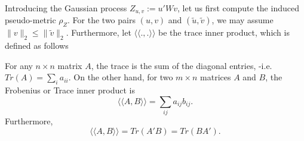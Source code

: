 \documentclass[10pt,handout,english]{beamer}
\begin{document}
\begin{frame}[allowframebreaks]
Introducing the Gaussian process $Z_{u,v}:=u'Wv$, let us first compute the induced pseudo-metric $\rho_Z$. For the two pairs $(u,v)$ and $(\tilde{u},\tilde{v})$, we may assume $\lVert v\rVert_2\leq\lVert\tilde{v}\rVert_2$. Furthermore, let $\langle\langle .,.\rangle\rangle$ be the trace inner product, which is defined as follows
\begin{definition}
For any $n\times n$ matrix $A$, the trace is the sum of the diagonal entries, -i.e. $Tr(A)=\sum\limits_{i}a_{ii}$. On the other hand, for two $m\times n$ matrices $A$ and $B$, the Frobenius or Trace inner product is
\[
\langle\langle A,B\rangle\rangle=\sum_{ij}a_{ij}b_{ij}.
\]
Furthermore, 
\[
\langle\langle A,B\rangle\rangle=Tr(A'B)=Tr(BA').
\]
\end{definition} 


\end{frame}
\end{document}
